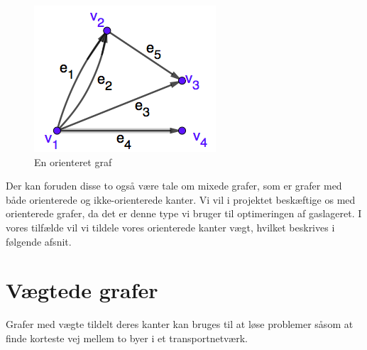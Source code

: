 \begin{figure}[H]
\centering
\includegraphics[scale=0.5]{fig/img/orienteret_graf.png}
\caption{En orienteret graf}
\label{fig:orienteret}
\end{figure}
Der kan foruden disse to også være tale om mixede grafer, som er grafer med både orienterede og ikke-orienterede kanter. Vi vil i projektet beskæftige os med orienterede grafer, da det er denne type vi bruger til optimeringen af gaslageret. I vores tilfælde vil vi tildele vores orienterede kanter vægt, hvilket beskrives i følgende afsnit.


\section{Vægtede grafer}
Grafer med vægte tildelt deres kanter kan bruges til at løse problemer såsom at finde korteste vej mellem to byer i et transportnetværk. 

